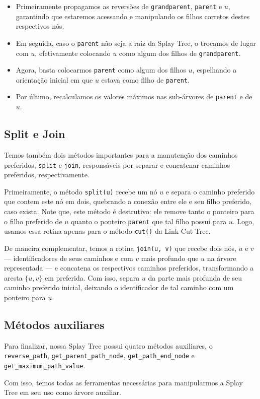 \begin{itemize}
    \item Primeiramente propagamos as reversões de \texttt{grandparent}, \texttt{parent} e $u$, garantindo que estaremos acessando e manipulando os filhos corretos destes respectivos nós.
    \item Em seguida, caso o \texttt{parent} não seja a raiz da Splay Tree, o trocamos  de lugar com $u$, efetivamente colocando $u$ como algum dos filhos de \texttt{grandparent}.
    \item Agora, basta colocarmos \texttt{parent} como algum dos filhos $u$, espelhando a orientação inicial em que $u$ estava como filho de \texttt{parent}.
    \item Por último, recalculamos os valores máximos nas sub-árvores de \texttt{parent} e de $u$.
\end{itemize}

\subsection{Split e Join}
\label{subsection:lct-splay-split-join}

Temos também dois métodos importantes para a manutenção dos caminhos preferidos, \texttt{split} e \texttt{join}, responsáveis por separar e concatenar caminhos preferidos, respectivamente.

Primeiramente, o método \texttt{split(u)} recebe um nó $u$ e separa o caminho preferido que contem este nó em dois, quebrando a conexão entre ele e seu filho preferido, caso exista. Note que, este método é destrutivo: ele remove tanto o ponteiro para o filho preferido de $u$ quanto o ponteiro \texttt{parent} que tal filho possui para $u$. Logo, usamos essa rotina apenas para o método \texttt{cut()} da Link-Cut Tree.

De maneira complementar, temos a rotina \texttt{join(u, v)} que recebe dois nós, $u$ e $v$ --- identificadores de seus caminhos e com $v$ mais profundo que $u$ na árvore representada --- e concatena os respectivos caminhos preferidos, transformando a aresta $\{u,v\}$ em preferida. Com isso, separa $u$ da parte mais profunda de seu caminho preferido inicial, deixando o identificador de tal caminho com um ponteiro para $u$.

\subsection{Métodos auxiliares}
\label{subsection:lct-splay-aux}

Para finalizar, nossa Splay Tree possui quatro métodos auxiliares, o \texttt{reverse\_path}, \texttt{get\_parent\_path\_node}, \texttt{get\_path\_end\_node} e \texttt{get\_maximum\_path\_value}.


Com isso, temos todas as ferramentas necessárias para manipularmos a Splay Tree em seu uso como árvore auxiliar.